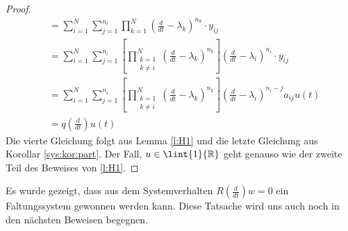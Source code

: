 \begin{satz}
\begin{proof}
\begin{align}
					    &= \sum_{i=1}^{N}{\sum^{n_i}_{j=1}{\prod_{k=1}^N (\frac{d}{dt} -\lambda_k)^{n_{k}} \cdot y_{ij}}}\\
					    &= \sum_{i=1}^{N}{\sum^{n_i}_{j=1}{\left[\prod_{\substack{k= 1\\k \neq i}}^N (\frac{d}{dt} -\lambda_k)^{n_{k}}\right] (\frac{d}{dt} -\lambda_i)^{n_{i}} \cdot y_{ij}}}\\
					    &= \sum_{i=1}^{N}{\sum^{n_i}_{j=1}{\left[\prod_{\substack{k= 1\\k \neq i}}^N (\frac{d}{dt} -\lambda_k)^{n_{k}}\right] (\frac{d}{dt} -\lambda_i)^{n_{i}-j}}a_{ij}u(t)}\\
					    &=q(\frac{d}{dt})u(t)
\end{align}
Die vierte Gleichung folgt aus Lemma \ref{l:H1} und die letzte Gleichung aus Korollar \ref{sys:kor:part}.
Der Fall, $u \in \lint{1}{\mathbb{R}}$ geht genauso wie der zweite Teil des Beweises von \ref{l:H1}.
\end{proof}				 
\end{satz}

Es wurde gezeigt, dass aus dem Systemverhalten $R(\frac{d}{dt}) w = 0$ ein Faltungssystem gewonnen werden kann. Diese Tatsache wird uns auch noch in den nächsten Beweisen begegnen.

